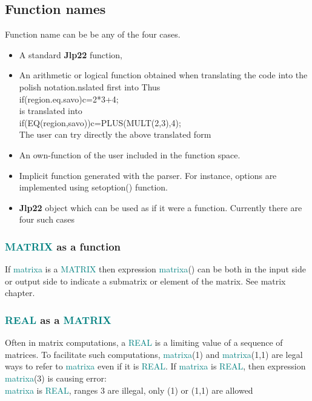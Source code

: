 {\subsection{Function names} 
\label{functionname} 
 
Function name can be be any of the four cases. 
\begin{itemize} 
 
\item A standard \textbf{Jlp22} function, 
\item An arithmetic or logical function obtained when translating the code into the polish notation.nslated first into 
Thus \\ 
\textcolor{VioletRed}{if}(region.eq.savo)c=2*3+4;\\ 
is translated into \\ 
\textcolor{VioletRed}{if}(\textcolor{VioletRed}{EQ}(region,savo))c=\textcolor{VioletRed}{PLUS}(\textcolor{VioletRed}{MULT}(2,3),4);\\ 
The user can try directly the above translated form 
\item An own-function of the user included in the function space. 
 
\item Implicit function generated with the parser. For instance, options are implemented using 
\textcolor{VioletRed}{setoption}() function. 
\item \textbf{Jlp22} object which can be used as if it were a function. Currently there 
are four such cases 
\end{itemize} 
\subsubsection{\textcolor{teal}{MATRIX} as a function} 
\label{matrixfunc} 
If \textcolor{teal}{matrixa} is a \textcolor{teal}{MATRIX} then expression \textcolor{teal}{matrixa}() can be both in the input side or output side to indicate 
a submatrix or element of the matrix. See matrix chapter. 
\subsubsection{\textcolor{teal}{REAL} as a \textcolor{teal}{MATRIX}} 
\label{realmatrix} 
Often in matrix computations, a \textcolor{teal}{REAL} is a limiting value of a sequence of matrices. 
To facilitate such computations, \textcolor{teal}{matrixa}(1) and \textcolor{teal}{matrixa}(1,1) are legal ways to refer to \textcolor{teal}{matrixa} even if it is \textcolor{teal}{REAL}. 
If \textcolor{teal}{matrixa} is \textcolor{teal}{REAL}, then expression \textcolor{teal}{matrixa}(3) is causing error:\\ 
\textcolor{teal}{matrixa} is \textcolor{teal}{REAL}, ranges            3  are illegal, only (1) or (1,1) are allowed 
}
